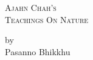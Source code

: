 \documentclass[11pt,a4paper,oneside,showtrims]{memoir}
\newlength\onePageHeight
\begin{document}

\raggedleft
\color{white}

{\scshape\LARGE
Ajahn Chah's\\[2mm]
\huge
Teachings On Nature
}

\vfill

{\authorFont\Large
by\\
Pasanno Bhikkhu
}
\end{document}
